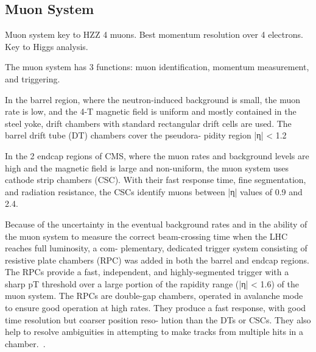 \subsection{Muon System}

Muon system key to HZZ 4 muons.  Best momentum resolution over 4 electrons. Key to Higgs analysis.

The muon system has 3 functions: muon identification, momentum measurement, and triggering.

In the barrel region, where the neutron-induced background is small, the muon rate is low, and the 4-T magnetic field is uniform and mostly contained in the steel yoke, drift chambers with standard rectangular drift cells are used. The barrel drift tube (DT) chambers cover the pseudora- pidity region |η| < 1.2

In the 2 endcap regions of CMS, where the muon rates and background levels are high and the magnetic field is large and non-uniform, the muon system uses cathode strip chambers (CSC). With their fast response time, fine segmentation, and radiation resistance, the CSCs identify muons between |η| values of 0.9 and 2.4.

Because of the uncertainty in the eventual background rates and in the ability of the muon system to measure the correct beam-crossing time when the LHC reaches full luminosity, a com- plementary, dedicated trigger system consisting of resistive plate chambers (RPC) was added in both the barrel and endcap regions. The RPCs provide a fast, independent, and highly-segmented trigger with a sharp pT threshold over a large portion of the rapidity range (|η| < 1.6) of the muon system. The RPCs are double-gap chambers, operated in avalanche mode to ensure good operation at high rates. They produce a fast response, with good time resolution but coarser position reso- lution than the DTs or CSCs. They also help to resolve ambiguities in attempting to make tracks from multiple hits in a chamber.~\cite{1748-0221-8-03-T03001}.


